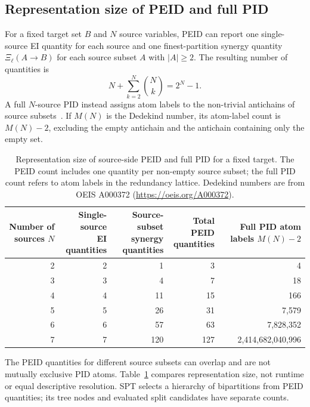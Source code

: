 \documentclass[fleqn,10pt]{wlscirep}
\begin{document}
\subsection{Representation size of PEID and full PID}
\label{app:peid_pid_representation}

For a fixed target set \(B\) and \(N\) source variables, PEID can report one single-source EI quantity for each source and one finest-partition synergy quantity \(\Xi_{\ell}(A\rightarrow B)\) for each source subset \(A\) with \(|A|\geq 2\). The resulting number of quantities is
\[
N+\sum_{k=2}^{N}\binom{N}{k}=2^{N}-1.
\]
A full \(N\)-source PID instead assigns atom labels to the non-trivial antichains of source subsets~\cite{Williams2010NonnegativeDO}. If \(M(N)\) is the Dedekind number, its atom-label count is \(M(N)-2\), excluding the empty antichain and the antichain containing only the empty set.

\begin{table}[htbp]
\centering
\footnotesize
\setlength{\tabcolsep}{4pt}
\begin{tabular}{r r r r r}
\hline
\shortstack{Number of\\sources \(N\)} &
\shortstack{Single-source\\EI quantities} &
\shortstack{Source-subset\\synergy quantities} &
\shortstack{Total PEID\\quantities} &
\shortstack{Full PID\\atom labels \(M(N)-2\)} \\
\hline
2 & 2 & 1 & 3 & 4 \\
3 & 3 & 4 & 7 & 18 \\
4 & 4 & 11 & 15 & 166 \\
5 & 5 & 26 & 31 & 7,579 \\
6 & 6 & 57 & 63 & 7,828,352 \\
7 & 7 & 120 & 127 & 2,414,682,040,996 \\
\hline
\end{tabular}
\caption{Representation size of source-side PEID and full PID for a fixed target. The PEID count includes one quantity per non-empty source subset; the full PID count refers to atom labels in the redundancy lattice. Dedekind numbers are from OEIS A000372 (\url{https://oeis.org/A000372}).}
\label{tab:peid_pid_representation}
\end{table}

The PEID quantities for different source subsets can overlap and are not mutually exclusive PID atoms. Table~\ref{tab:peid_pid_representation} compares representation size, not runtime or equal descriptive resolution. SPT selects a hierarchy of bipartitions from PEID quantities; its tree nodes and evaluated split candidates have separate counts.
\end{document}
